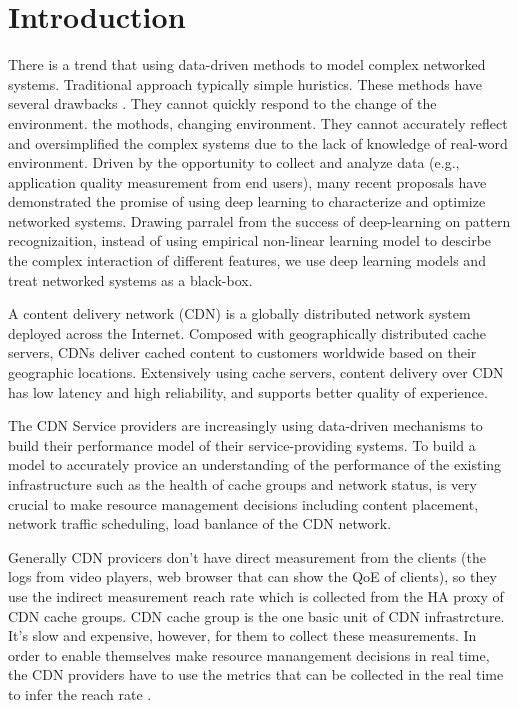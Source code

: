 \documentclass[review]{elsarticle}
\newcommand{\dabiaolv}{reach rate }
\begin{document}
\section{Introduction}
There is a trend \cite{Jiang2017Pytheas:Exploration-Exploitation} \cite{Mao2017NeuralPensieve} that using data-driven methods to model complex networked systems. Traditional approach typically simple huristics. These methods have several drawbacks  \cite{Mao2017NeuralPensieve}. They cannot quickly respond to the change of the environment. the mothods, changing environment. They cannot accurately reflect and oversimplified the complex systems due to the lack of knowledge of real-word environment. Driven by the opportunity to collect and analyze data (e.g., application quality measurement from end users), many recent proposals have demonstrated the promise of using deep learning to characterize and optimize networked systems. Drawing parralel from the success of deep-learning on pattern recognizaition, instead of using empirical non-linear learning model to descirbe the complex interaction of different features, we use deep learning models and treat networked systems as a black-box.

A content delivery network (CDN) is a globally distributed network system deployed across the Internet. Composed with geographically distributed cache servers, CDNs deliver cached content  to  customers  worldwide  based  on their geographic locations. Extensively  using  cache  servers,  content  delivery over  CDN  has  low  latency  and  high  reliability,  and  supports better quality of experience.

The CDN Service providers are increasingly using data-driven mechanisms to build their performance model of their service-providing systems. To build a model to accurately provice an understanding of the performance of the existing infrastructure such as the health of cache groups and network status, is very crucial to make resource management decisions including content placement, network traffic scheduling, load banlance of the CDN network. 

Generally CDN provicers don't have direct measurement from the clients (the logs from video players, web browser that can show the QoE of clients), so they use the indirect measurement \dabiaolv which is collected from the HA proxy of CDN cache groups. CDN cache group is the one basic unit of CDN infrastrcture. It's slow and expensive, however, for them to collect these measurements. In order to enable themselves make resource manangement decisions in real time, the CDN providers have to use the metrics that can be collected in the real time to infer the \dabiaolv. 
\end{document}
